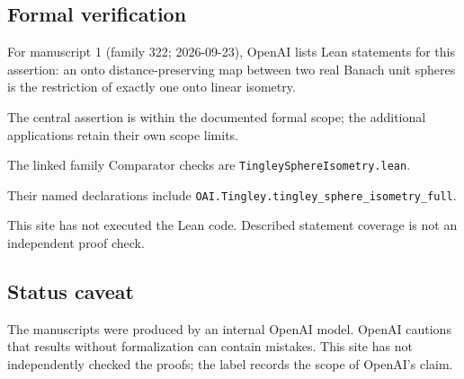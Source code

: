 \documentclass[11pt]{article}
\begin{document}
\subsection{Formal verification}
For manuscript 1 (family 322; 2026-09-23), OpenAI lists Lean statements for this assertion: an onto distance-preserving map between two real Banach unit spheres is the restriction of exactly one onto linear isometry.

The central assertion is within the documented formal scope; the additional applications retain their own scope limits.

The linked family Comparator checks are \texttt{TingleySphereIsometry.lean}.

Their named declarations include \texttt{OAI.Tingley.tingley\_sphere\_isometry\_full}.

This site has not executed the Lean code. Described statement coverage is not an independent proof check.

\subsection{Status caveat}
The manuscripts were produced by an internal OpenAI model. OpenAI cautions that results without formalization can contain mistakes. This site has not independently checked the proofs; the label records the scope of OpenAI's claim.
\end{document}
